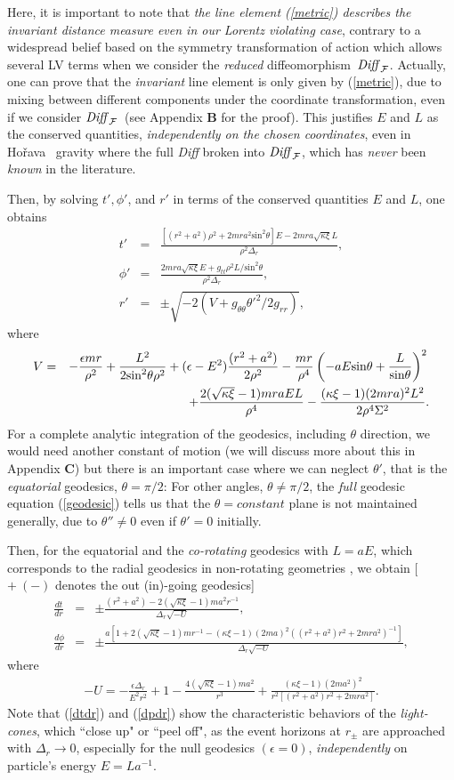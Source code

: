 \documentclass[preprint,aps,tightenlines,showkeys,nofootinbib,superscriptaddress]{revtex4}
\newcommand{\beq}{\begin{eqnarray}}
\newcommand{\eeq}{\end{eqnarray}}
\newcommand{\ep}{{\epsilon}}
\newcommand{\De}{\Delta}
\newcommand{\ka}{\kappa}
\newcommand{\Si}{{\Sigma}}
\newcommand{\no}{{\nonumber}}
\newcommand{\f}{\frac}
\newcommand{\ra}{\rightarrow}
\newcommand{\Ho}{Ho\v{r}ava}
\newcommand{\diff}{diffeomorphism}
\newcommand{\DiffF}{${\it Diff}_{\cal F}$}
\begin{document}
Here, it is important to note that {\it the line element (\ref{metric}) describes the invariant distance measure even in our Lorentz violating case}, contrary to a widespread belief based on the symmetry transformation of action which allows several LV terms when we consider the {\it reduced} \diff~\DiffF. Actually, one can prove that the {\it invariant} line element is only given by  (\ref{metric}), due to mixing between different components under the coordinate transformation, even if we consider \DiffF~(see Appendix {\bf B} for the proof). This justifies $E$ and $L$ as the conserved quantities, {\it independently on the chosen coordinates}, even in \Ho~ gravity where the full {\it Diff} broken into \DiffF, which has {\it never} been {\it known} in the literature.

Then, by solving ${t'}, {\phi'}$, and ${r'}$ in terms of the conserved quantities $E$ and $L$, one obtains
\beq
{t'}&=&\f{\left[(r^2+a^2) \rho^2+2mra^2 \mbox{sin}^2 \theta\right] E-2mra \sqrt{\ka \xi} L}{\rho^2 \De_r},\\
{\phi'}&=& \f{2mra \sqrt{\ka \xi} E+g_{tt} \rho^2 L/\mbox{sin}^2 \theta}{\rho^2 \De_r},\\
{r'}&=&\pm \sqrt{-2 \left(V+g_{\theta \theta} {\theta'}^2/2 g_{rr} \right)},
\eeq
where
\beq
V&=&-\f{\ep mr}{\rho^2}+\f{L^2}{2 \mbox{sin}^2\theta \rho^2}+(\ep-E^2) \f{(r^2+a^2)}{2 \rho^2}-\f{mr}{\rho^4} \left(-a E \mbox{sin}\theta+\f{L}{\mbox{sin}\theta} \right)^2 \no \\
&&+\f{ 2 (\sqrt{\ka \xi}-1) mra  E L}{\rho^4}- \f{(\ka \xi-1)  (2 mra)^2 L^2}{2 \rho^4 \Si^2}.
\eeq
For a complete analytic integration of the geodesics, including $\theta$ direction, we would need another constant of motion (we will discuss more about this in Appendix {\bf C}) but there is an important case where we can neglect ${\theta'}$, that is the {\it equatorial} geodesics, $\theta=\pi/2$: For other angles, $\theta \neq \pi/2$, the {\it full} geodesic equation (\ref{geodesic}) tells us that the $\theta=constant$ plane is not maintained generally, due to ${\theta''} \neq 0$ even if ${\theta'}=0$ initially.

Then, for the equatorial and the {\it co-rotating} geodesics with $L=a E$, which corresponds to the radial geodesics in non-rotating geometries \cite{Chan:1985}, we obtain [$+~ (-)$ denotes the out (in)-going geodesics]
\beq
\f{dt}{dr}&=&\pm \f{(r^2+a^2)-2 (\sqrt{\ka \xi}-1) ma^2 r^{-1} }{\De_r \sqrt{-U}},\label{dtdr}\\
\f{d \phi}{ dr} &=& \pm \f{a \left[ 1+2 (\sqrt{\ka \xi}-1) m r^{-1} - (\ka \xi-1) (2ma)^2 \left( (r^2+a^2)r^2+2 mr a^2\right)^{-1}\right]}{\De_r \sqrt{-U}},\label{dpdr}
\eeq
where
\beq
-U=-\f{\ep \De_r}{E^2 r^2}+1-\f{ 4 (\sqrt{\ka \xi}-1) ma^2 }{r^3}
+\f{(\ka \xi-1)  (2 ma^2)^2}{r^2 [(r^2+a^2) r^2 +2mr a^2]}.
\eeq
Note that (\ref{dtdr}) and (\ref{dpdr}) show the characteristic behaviors of the {\it light-cones}, which ``close up" or ``peel off", as the event horizons at $r_{\pm}$ are approached with $\De_r\ra 0$, especially for the null geodesics $(\ep=0)$, {\it independently} on particle's energy $E=L a^{-1}$.
\end{document}

